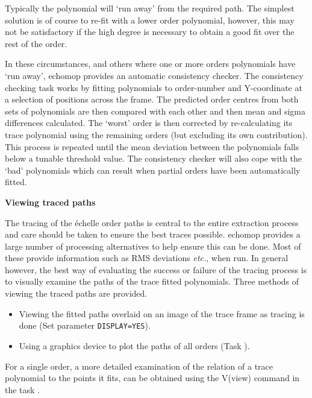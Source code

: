 Typically the polynomial will `run away' from the required path. The
simplest solution is of course to re-fit with a lower order polynomial,
however, this may not be satisfactory if the high degree is necessary to
obtain a good fit over the rest of the order.

In these circumstances, and others where one or more orders polynomials
have `run away', {\sc echomop} provides an automatic consistency checker. The
consistency checking task works by fitting polynomials to order-number and
Y-coordinate at a selection of positions across the frame.
 The predicted order centres from both sets of
polynomials are then compared with each other and then mean and sigma
differences calculated. The `worst' order is then corrected by
re-calculating its trace polynomial using the remaining orders (but
excluding its own contribution). This process is repeated until the mean
deviation between the polynomials falls below a tunable threshold
value. The consistency checker will also cope with the `bad' polynomials
which can result when partial orders have been automatically fitted.

\newpage
{\large\bf Viewing traced paths}

The tracing of the \'{e}chelle order paths is central to the entire
extraction process and care should be taken to ensure the best traces
possible. {\sc echomop} provides a large number of processing alternatives to
help ensure this can be done. Most of these provide information such as
RMS deviations {\it etc.}, when run. In general however, the best way of
evaluating the success or failure of the tracing process is to visually
examine the paths of the trace fitted polynomials. Three methods of
viewing the traced paths are provided. 

\begin{itemize}

\item Viewing the fitted paths overlaid on an image of the trace frame
      as tracing is done (Set parameter \verb+DISPLAY=YES+).

\item Using a graphics device to plot the paths of all orders
      (Task ).

\end{itemize}

For a single order, a more detailed examination of the relation of a
trace polynomial to the points it fits, can be obtained using the
V(view) command in the task .

